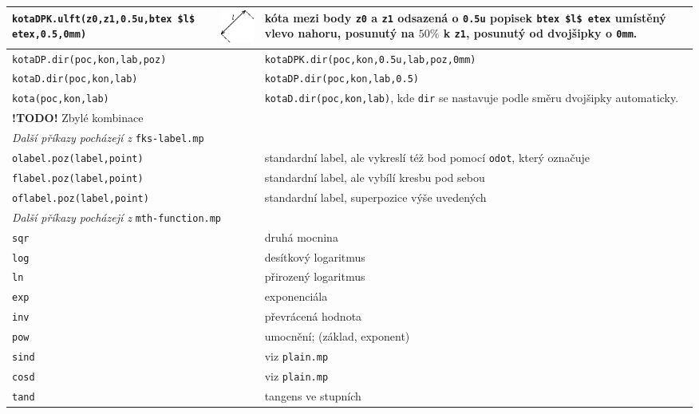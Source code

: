 \documentclass[a4paper,10pt]{article}
\begin{document}
\begin{tabularx}{\textwidth}{|l|l|X|}
    \verb+kotaDPK.ulft(z0,z1,0.5u,btex $l$ etex,0.5,0mm)+ &
	\raise-24pt\hbox{\includegraphics{mp_fks_15}} & 
	kóta mezi body \verb+z0+ a \verb+z1+ odsazená o \verb+0.5u+ popisek 
	\verb+btex $l$ etex+ umístěný vlevo nahoru, posunutý na $50\%$ 
	k \verb+z1+, posunutý od dvojšipky o \verb+0mm+.\\\hline
    \verb+kotaDP.dir(poc,kon,lab,poz)+ &&
	\verb+kotaDPK.dir(poc,kon,0.5u,lab,poz,0mm)+\\\hline
    \verb+kotaD.dir(poc,kon,lab)+ &&
	\verb+kotaDP.dir(poc,kon,lab,0.5)+\\\hline
    \verb+kota(poc,kon,lab)+ &&
	\verb+kotaD.dir(poc,kon,lab)+, kde \verb+dir+ se nastavuje podle
	směru dvojšipky automaticky.\\\hline
    {\bf !TODO!} Zbylé kombinace&&\\\hline
    \multicolumn{3}{|l|}{\emph{Další příkazy pocházejí z} {\tt fks-label.mp}}\\\hline
    \verb+olabel.poz(label,point)+ & & 
	standardní label, ale vykreslí též bod pomocí \verb+odot+, 
	který označuje\\\hline
    \verb+flabel.poz(label,point)+ & & 
	standardní label, ale vybílí kresbu pod sebou\\\hline
    \verb+oflabel.poz(label,point)+ & & 
	standardní label, superpozice výše uvedených\\\hline
    \multicolumn{3}{|l|}{\emph{Další příkazy pocházejí z} 
	{\tt mth-function.mp}}\\\hline
    \verb+sqr+  && druhá mocnina\\\hline
    \verb+log+  && desítkový logaritmus\\\hline
    \verb+ln+   && přirozený logaritmus\\\hline
    \verb+exp+  && exponenciála\\\hline
    \verb+inv+  && převrácená hodnota\\\hline
    \verb+pow+  && umocnění; (základ, exponent)\\\hline
    \hline
    \verb+sind+ && viz {\tt plain.mp}\\\hline
    \verb+cosd+ && viz {\tt plain.mp}\\\hline
    \verb+tand+ && tangens ve stupních\\\hline

\end{tabularx}
\end{document}
